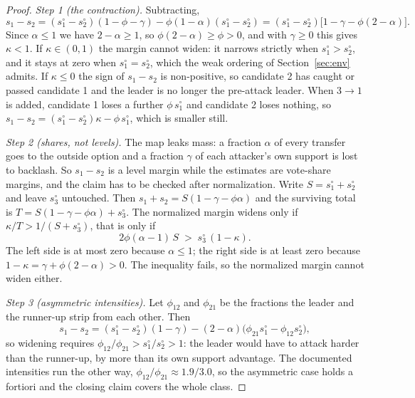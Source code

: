 \documentclass[11pt]{article}
\theoremstyle{definition}
\theoremstyle{remark}
\begin{document}
\begin{proof}
\emph{Step 1 (the contraction).} Subtracting,
\[
  s_1 - s_2
  = (s^\circ_1 - s^\circ_2)(1 - \phi - \gamma)
    - \phi(1-\alpha)(s^\circ_1 - s^\circ_2)
  = (s^\circ_1 - s^\circ_2)\bigl[1 - \gamma - \phi(2-\alpha)\bigr].
\]
Since $\alpha \le 1$ we have $2 - \alpha \ge 1$, so $\phi(2-\alpha) \ge \phi >
0$, and with $\gamma \ge 0$ this gives $\kappa < 1$. If $\kappa \in (0,1)$ the
margin cannot widen: it narrows strictly when $s^\circ_1 > s^\circ_2$, and it
stays at zero when $s^\circ_1 = s^\circ_2$, which the weak ordering of
Section~\ref{sec:env} admits. If $\kappa \le 0$ the sign of $s_1 - s_2$ is
non-positive, so candidate 2 has caught or passed candidate 1 and the leader
is no longer the pre-attack leader. When $3 \to 1$ is added, candidate 1 loses
a further $\phi\,s^\circ_1$ and candidate 2 loses nothing, so
$s_1 - s_2 = (s^\circ_1 - s^\circ_2)\kappa - \phi\,s^\circ_1$, which is
smaller still.

\emph{Step 2 (shares, not levels).} The map leaks mass: a fraction $\alpha$ of
every transfer goes to the outside option and a fraction $\gamma$ of each
attacker's own support is lost to backlash. So $s_1 - s_2$ is a level margin
while the estimates are vote-share margins, and the claim has to be checked
after normalization. Write $S = s^\circ_1 + s^\circ_2$ and leave $s^\circ_3$
untouched. Then $s_1 + s_2 = S(1 - \gamma - \phi\alpha)$ and the surviving
total is $T = S(1 - \gamma - \phi\alpha) + s^\circ_3$. The normalized margin
widens only if $\kappa/T > 1/(S + s^\circ_3)$, that is only if
\[
  2\phi(\alpha - 1)\,S \;>\; s^\circ_3\,(1 - \kappa).
\]
The left side is at most zero because $\alpha \le 1$; the right side is at
least zero because $1 - \kappa = \gamma + \phi(2-\alpha) > 0$. The inequality
fails, so the normalized margin cannot widen either.

\emph{Step 3 (asymmetric intensities).} Let $\phi_{12}$ and $\phi_{21}$ be the
fractions the leader and the runner-up strip from each other. Then
\[
  s_1 - s_2 = (s^\circ_1 - s^\circ_2)(1-\gamma)
    - (2-\alpha)\bigl(\phi_{21}s^\circ_1 - \phi_{12}s^\circ_2\bigr),
\]
so widening requires $\phi_{12}/\phi_{21} > s^\circ_1/s^\circ_2 > 1$: the
leader would have to attack harder than the runner-up, by more than its own
support advantage. The documented intensities run the other way,
$\phi_{12}/\phi_{21} \approx 1.9/3.0$, so the asymmetric case holds a
fortiori and the closing claim covers the whole class.
\end{proof}
\end{document}
